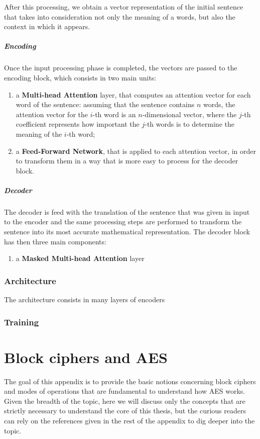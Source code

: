 \documentclass[12pt,a4paper]{book}
\theoremstyle{definition}
\begin{document}
	After this processing, we obtain a vector representation of the initial sentence that takes into consideration not only the meaning of a words, but also the context in which it appears.
	\paragraph{Encoding}
	Once the input processing phase is completed, the vectors are passed to the encoding block, which consists in two main units:
	\begin{enumerate}
		\item a \textbf{Multi-head Attention} layer, that computes an attention vector for each word of the sentence: assuming that the sentence contains $n$ words, the attention vector for the $i$-th word is an $n$-dimensional vector, where the $j$-th coefficient represents how important the $j$-th words is to determine the meaning of the $i$-th word;
		\item a \textbf{Feed-Forward Network}, that is applied to each attention vector, in order to transform them in a way that is more easy to process for the decoder block.
	\end{enumerate} 
	
	\paragraph{Decoder}
	The decoder is feed with the translation of the sentence that was given in input to the encoder and the same processing steps are performed to transform the sentence into its most accurate mathematical representation. The decoder block has then three main components:
	\begin{enumerate}
		\item a \textbf{Masked Multi-head Attention} layer
	\end{enumerate}
	
	\subsection{Architecture}
	The architecture consists in many layers of encoders

	\subsection{Training}
	
	\chapter{Block ciphers and AES}\label{appendix:aes}
	The goal of this appendix is to provide the basic notions concerning block ciphers and modes of operations that are fundamental to understand how AES works. Given the breadth of the topic, here we will discuss only the concepts that are strictly necessary to understand the core of this thesis, but the curious readers can rely on the references given in the rest of the appendix to dig deeper into the topic.
	
\end{document}
